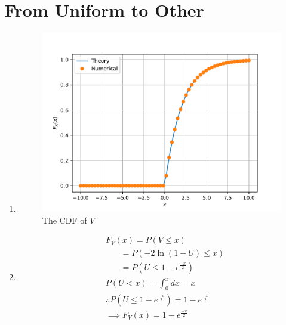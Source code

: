 \documentclass[journal,12pt,twocolumn]{IEEEtran}
\renewcommand\thesection{\arabic{section}}
\begin{document}
    \section{From Uniform to Other}
    \begin{enumerate}[label=\thesection.\arabic*,ref=\thesection.\theenumi]
    \item
    \begin{figure}
        \centering
        \includegraphics[width=\columnwidth]{../figs/V_cdf}
        \caption{The CDF of $V$}\label{fig:V_cdf}
        \end{figure}
    \item \begin{align}
        &F_{V}(x)=P(V \leq x)\\
        &~~~~~~~~=P(-2 \ln (1-U) \leq x)\\
        &~~~~~~~~=P(U \leq 1-e^{\frac{-x}{2}})\\
        &P(U<x)=\int_{0}^{x} dx=x\\
        &\therefore P(U \leq 1-e^{\frac{-x}{2}})=1-e^{\frac{-x}{2}} \\ 
        &\implies F_{V}(x) = 1-e^{\frac{-x}{2}}
        \end{align}
    \end{enumerate}
    
\end{document}
